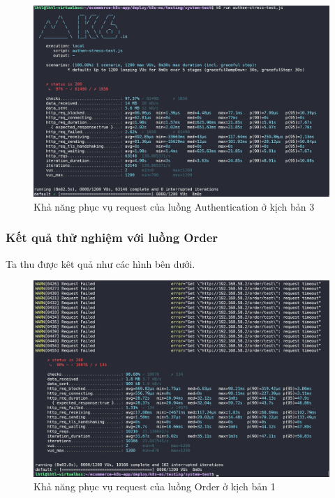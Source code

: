 \begin{figure}[H]
  \begin{center}
      \includegraphics[scale = 0.65]{images/hanh/fullflow-test/full-flow-authen-10-db-with-lb}
      \vspace*{1mm}
  \end{center}
  \caption{Khả năng phục vụ request của luồng Authentication ở kịch bản 3}
  \label{fig:fullflow-authen-with-hpa-10-db}

\end{figure}

\subsubsection{Kết quả thử nghiệm với luồng Order}
\noindent Ta thu được kêt quả như các hình bên dưới.
\begin{figure}[H]
  \begin{center}
      \includegraphics[scale = 0.65]{images/hanh/fullflow-test/order-no-hpa}
      \vspace*{1mm}
  \end{center}
  \caption{Khả năng phục vụ request của luồng Order ở kịch bản 1}
  \label{fig:fullflow-order-no-hpa}

\end{figure}

